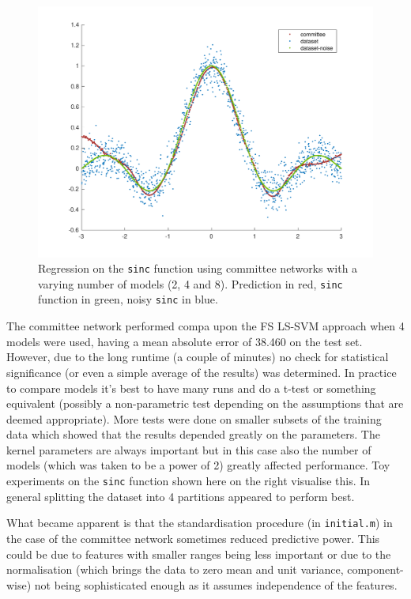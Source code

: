 \begin{figure}
\begin{minipage}{\linewidth}
\includegraphics[width=\linewidth]{../src/figures/committee/sinc_8_models}
\end{minipage}
\caption{Regression on the \texttt{sinc} function using committee networks with a varying number of models (2, 4 and 8). Prediction in red, \texttt{sinc} function in green, noisy \texttt{sinc} in blue.}
\label{committeesinc}
\end{figure}

\par The committee network performed compa upon the FS LS-SVM approach when 4 models were used, having a mean absolute error of 38.460 on the test set. However, due to the long runtime (a couple of minutes) no check for statistical significance (or even a simple average of the results) was determined. In practice to compare models it's best to have many runs and do a t-test or something equivalent (possibly a non-parametric test depending on the assumptions that are deemed appropriate). More tests were done on smaller subsets of the training data which showed that the results depended greatly on the parameters. The kernel parameters are always important but in this case also the number of models (which was taken to be a power of 2) greatly affected performance. Toy experiments on the \texttt{sinc} function shown here on the right visualise this. In general splitting the dataset into 4 partitions appeared to perform best.

\par What became apparent is that the standardisation procedure (in \texttt{initial.m}) in the case of the committee network sometimes reduced predictive power. This could be due to features with smaller ranges being less important or due to the normalisation (which brings the data to zero mean and unit variance, component-wise) not being sophisticated enough as it assumes independence of the features.

